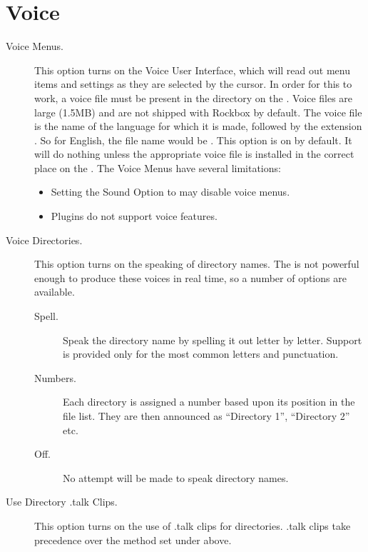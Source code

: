 \section{\label{ref:Voiceconfiguration}Voice}

  \begin{description}
  \item[Voice Menus.]
    This option turns on the Voice User Interface, which will read out menu
    items and settings as they are selected by the cursor.  In order for this
    to work, a voice file must be present in the 
    directory on the \dap.  Voice files are large (1.5MB) and are not 
    shipped with Rockbox by default.
    The voice file is the name of the language for which it is made, followed
    by the extension .  So for English, the file name would be 
    .
    This option is on by default.  It will do nothing unless the 
    appropriate voice file is installed in the correct place on the \dap.
    The Voice Menus have several limitations:
    \begin{itemize}
    \item Setting the Sound Option  to  may 
      disable voice menus.
    \item Plugins  do not support
      voice features.
    \end{itemize}

  \item[Voice Directories.]
    This option turns on the speaking of directory names.  The \dap{} 
    is not powerful enough to produce these voices in real time, so a number 
    of options are available.
    \begin{description}
    \item[Spell.]
      Speak the directory name by spelling it out letter by letter.  Support
      is provided only for the most common letters and punctuation.
    \item[Numbers.]
      Each directory is assigned a number based upon its position in the
      file list.  They are then announced as ``Directory 1'', ``Directory 2''
      etc.
    \item[Off.]
      No attempt will be made to speak directory names.
    \end{description}

  \item[Use Directory .talk Clips.]
    This option turns on the use of .talk clips for directories. .talk clips take
    precedence over the method set under  above.


\end{description}
